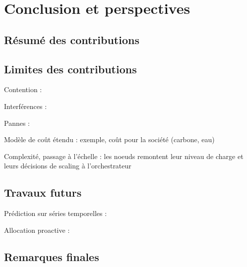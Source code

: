 \chapter{Conclusion et perspectives}

\section{Résumé des contributions}

\section{Limites des contributions}

Contention : \cite{vanbeekCPUContentionPredictor2019} \cite{jacquetSweetspotVMOversubscribingCPU}

Interférences : \cite{kohAnalysisPerformanceInterference2007} \cite{vardasImprovedParallelApplication}

Pannes : \cite{javadiFailureTraceArchive2013, galletModelSpaceCorrelatedFailures2010}

Modèle de coût étendu : exemple, coût pour la société (carbone, eau) \cite{rickeCountrylevelSocialCost2018}

Complexité, passage à l'échelle : les noeuds remontent leur niveau de charge et leurs décisions de scaling à l'orchestrateur \cite{straesserPowerApplicationsVision2023}

\section{Travaux futurs}


Prédiction sur séries temporelles : \cite{bauerTimeSeriesForecasting2020}

Allocation proactive : \cite{parkGraphNeuralNetworkBased2024}

\section{Remarques finales}
